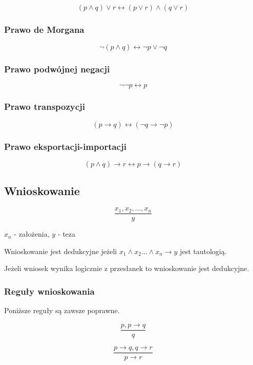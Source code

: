 \documentclass{../notatki}
\begin{document}
$$(p \land q) \lor r \leftrightarrow (p \lor r) \land (q \lor r)$$

\subsubsection{Prawo de Morgana}

$$
\neg (p \land q) \leftrightarrow \neg p \lor \neg q
$$

\subsubsection{Prawo podwójnej negacji}

$$
\neg \neg p \leftrightarrow p
$$

\subsubsection{Prawo transpozycji}

$$
(p \rightarrow q) \leftrightarrow (\neg q \rightarrow \neg p)
$$

\subsubsection{Prawo eksportacji-importacji}

$$
(p \land q) \rightarrow r \leftrightarrow p \rightarrow (q \rightarrow r)
$$

\subsection{Wnioskowanie}

$$
\frac{x_1, x_2, \ldots, x_n}{y}
$$

$x_n$ - założenia, $y$ - teza

Wnioskowanie jest dedukcyjne jeżeli $x_1 \land x_2 \dots \land x_n
\rightarrow y$ jest tautologią.

Jeżeli wniosek wynika logicznie z przesłanek to wnioskowanie jest dedukcyjne.

\subsubsection{Reguły wnioskowania}

Poniższe reguły są zawsze poprawne.

$$
\frac{p, p \rightarrow q}{q}
$$

$$
\frac{p\rightarrow q, q \rightarrow r}{p \rightarrow r}
$$
\end{document}
